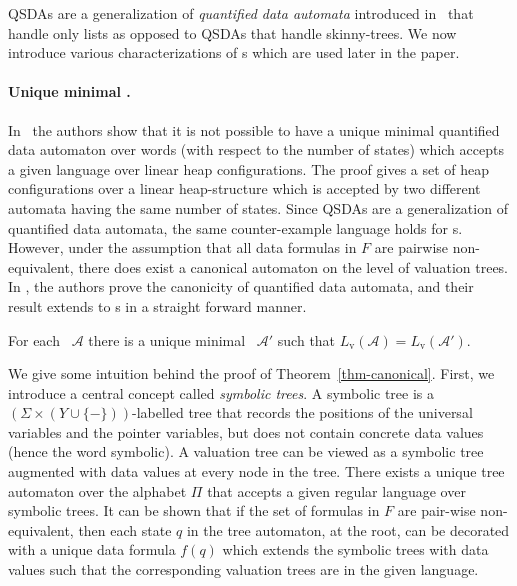 \documentclass{llncs}
\newcommand{\A}{\mathcal{A}}
\newcommand{\Lval}{L_{\text{v}}}
\begin{document}
QSDAs are a generalization of {\em quantified data automata} introduced in~\cite{CAVQDA} that handle only lists as opposed to QSDAs that handle skinny-trees.
We now introduce various characterizations of \QSDA s which are used later in the paper.

\paragraph{\bf Unique minimal \QSDA.} In~\cite{CAVQDA} the authors show that it is not possible to have a unique minimal quantified data automaton over words (with respect to the number of states) which accepts a given language over linear heap configurations. The proof gives a set of heap configurations over a linear heap-structure which is accepted by two different automata having the same number of states. Since QSDAs are a generalization of quantified data automata, the same counter-example language holds for \QSDA s.
However, under the assumption that all data formulas in $F$ are pairwise non-equivalent, there does exist a canonical automaton on the level of valuation trees. In \cite{CAVQDA}, the authors prove the canonicity of quantified data automata, and their result extends to \QSDA s in a straight forward manner.

\begin{theorem}
\label{thm-canonical}
For each \QSDA\ $\A$ there is a unique minimal \QSDA\ $\A'$ such that
$\Lval(\A)=\Lval(\A')$.
\end{theorem}











We give some intuition behind the proof of Theorem~\ref{thm-canonical}.
First, we introduce a central concept called \emph{symbolic trees}. A symbolic tree is a $(\Sigma \times (Y \cup \{-\}))$-labelled tree that records the positions of the universal variables and the pointer variables, but does not contain concrete data values (hence the word symbolic).
A valuation tree can be viewed as a symbolic tree augmented with data values at every node in the tree. There exists a unique tree automaton over the alphabet $\Pi$ that accepts a given regular language over symbolic trees. It can be shown that if the set of formulas in $F$ are pair-wise non-equivalent,
then each state $q$  in the tree automaton, at the root, can be decorated with a unique data formula $f(q)$ which extends the symbolic trees with data values such that the corresponding valuation trees are in the given language.
\end{document}

